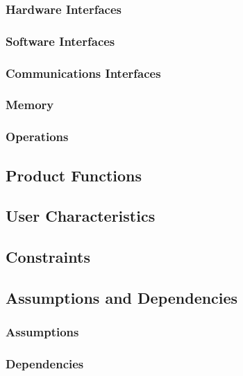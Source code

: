 \documentclass[english]{article}
\begin{document}
				\subsubsection{Hardware Interfaces}
				   
				\subsubsection{Software Interfaces}
			
				\subsubsection{Communications Interfaces}
			
				\subsubsection{Memory}

				\subsubsection{Operations}

				\subsection{Product Functions}

				\subsection{User Characteristics}
				
			
				\subsection{Constraints}
            

				\subsection{Assumptions and Dependencies}
				\subsubsection{Assumptions}


	
				\begin{large}
				\subsubsection{Dependencies}
				\end{large}
		
\end{document}
